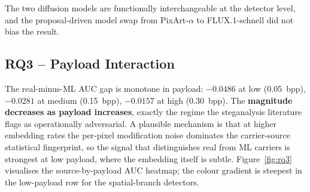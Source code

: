 \documentclass[10pt,twocolumn,a4paper]{article}
\begin{document}
The two diffusion models are functionally interchangeable at the detector level, and the proposal-driven model swap from PixArt-$\alpha$ to FLUX.1-schnell did not bias the result.

\subsection{RQ3 -- Payload Interaction}

The real-minus-ML AUC gap is monotone in payload: $-0.0486$ at low (0.05~bpp), $-0.0281$ at medium (0.15~bpp), $-0.0157$ at high (0.30~bpp). The \textbf{magnitude decreases as payload increases}, exactly the regime the steganalysis literature flags as operationally adversarial. A plausible mechanism is that at higher embedding rates the per-pixel modification noise dominates the carrier-source statistical fingerprint, so the signal that distinguishes real from ML carriers is strongest at low payload, where the embedding itself is subtle. Figure~\ref{fig:rq3} visualises the source-by-payload AUC heatmap; the colour gradient is steepest in the low-payload row for the spatial-branch detectors.
\end{document}
